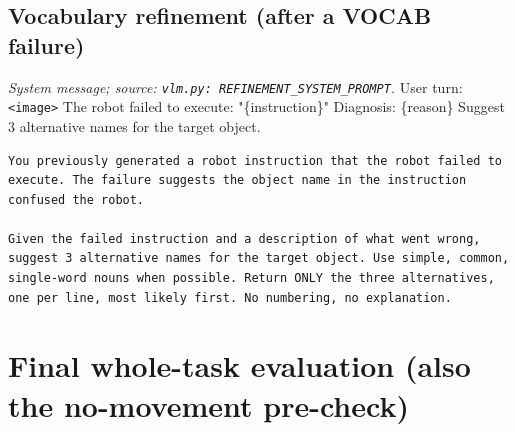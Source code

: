 \subsection*{Vocabulary refinement (after a VOCAB failure)}
\noindent\textit{System message; source: \texttt{vlm.py: REFINEMENT\_SYSTEM\_PROMPT}.} User turn: \texttt{<image>} The robot failed to execute: "\{instruction\}" Diagnosis: \{reason\} Suggest 3 alternative names for the target object.
\begin{lstlisting}[style=prompt]
You previously generated a robot instruction that the robot failed to execute. The failure suggests the object name in the instruction confused the robot.

Given the failed instruction and a description of what went wrong, suggest 3 alternative names for the target object. Use simple, common, single-word nouns when possible. Return ONLY the three alternatives, one per line, most likely first. No numbering, no explanation.
\end{lstlisting}

\section{Final whole-task evaluation (also the no-movement pre-check)}
